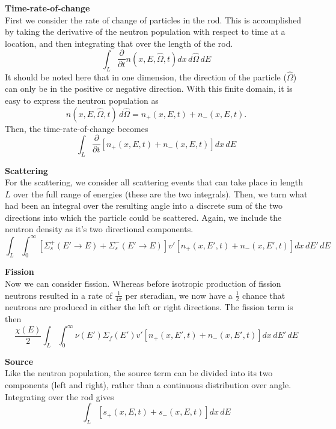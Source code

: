 \documentclass{article}
\begin{document}
\textbf{Time-rate-of-change}\\
First we consider the rate of change of particles in the rod. This is accomplished by taking the derivative of the neutron population with respect to time at a location, and then integrating that over the length of the rod.
$$ \int_L \frac{\partial}{\partial t}n(x,E,\hat{\Omega},t)dx\,d\hat{\Omega}\,dE $$
It should be noted here that in one dimension, the direction of the particle ($\hat{\Omega}$) can only be in the positive or negative direction. With this finite domain, it is easy to express the neutron population as
$$ n(x,E,\hat{\Omega},t)\,d\hat{\Omega} = n_{+}(x,E,t) + n_{-}(x,E,t). $$
Then, the time-rate-of-change becomes
$$ \int_L \frac{\partial}{\partial t}\left[n_{+}(x,E,t) + n_{-}(x,E,t)\right]dx\,dE $$

\textbf{Scattering}\\
For the scattering, we consider all scattering events that can take place in length $L$ over the full range of energies (these are the two integrals). Then, we turn what had been an integral over the resulting angle into a discrete sum of the two directions into which the particle could be scattered. Again, we include the neutron density as it's two directional components.
$$ \int_L \int_0^{\infty} \left[\Sigma_s^{+}(E'\rightarrow E) + \Sigma_s^{-}(E'\rightarrow E)\right] v' \left[n_{+}(x,E',t) + n_{-}(x,E',t)\right]dx\,dE'\,dE$$

\textbf{Fission}\\
Now we can consider fission. Whereas before isotropic production of fission neutrons resulted in a rate of $\frac{1}{4\pi}$ per steradian, we now have a $\frac{1}{2}$ chance that neutrons are produced in either the left or right directions. The fission term is then
$$ \frac{\chi(E)}{2} \int_L \int_0^{\infty} \nu(E') \Sigma_f(E') v' \left[n_{+}(x,E',t) + n_{-}(x,E',t)\right]dx\,dE'\,dE $$

\textbf{Source}\\
Like the neutron population, the source term can be divided into its two components (left and right), rather than a continuous distribution over angle. Integrating over the rod gives
$$ \int_L \left[s_{+}(x,E,t) + s_{-}(x,E,t)\right]dx\,dE $$



\end{document}
